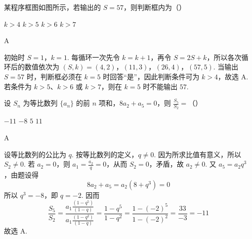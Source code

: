 \begin{problem}
某程序框图如图所示，若输出的 \(S = 57\)，则判断框内为（\quad）


\choices
    {\(k > 4\)}
    {\(k > 5\)}
    {\(k > 6\)}
    {\(k > 7\)}

\begin{answer}
A
\end{answer}

\begin{solution}
初始时 \(S=1\)，\(k=1\). 每循环一次先令 \(k=k+1\)，再令
\(S=2S+k\)，所以各次循环后的数值依次为
\((S,k)=(4,2)\)，\((11,3)\)，\((26,4)\)，\((57,5)\).
当输出 \(S=57\) 时，判断框必须在 \(k=5\) 时回答“是”，因此判断条件可为
\(k>4\)，故选 A. 若条件为 \(k>5\)、\(k>6\) 或 \(k>7\)，则在 \(k=5\) 时不能输出 \(57\).
\end{solution}
\end{problem}

\begin{problem}
设 \(S_n\) 为等比数列 \(\{a_n\}\) 的前 \(n\) 项和，\(8a_2 + a_5 = 0\)，则 \(\frac{S_5}{S_2} =\)（\quad）

\choices
    {\(-11\)}
    {\(-8\)}
    {\(5\)}
    {\(11\)}

\begin{answer}
A
\end{answer}

\begin{solution}
设等比数列的公比为 \(q\). 按等比数列的定义，\(q\ne0\). 因为所求比值有意义，所以
\(S_2\ne0\). 若 \(a_2=0\)，则 \(a_1=\frac{a_2}{q}=0\)，从而 \(S_2=0\)，矛盾，故
\(a_2\ne0\). 又
\(a_5=a_2q^3\)，由题设得
\[
8a_2+a_5=a_2(8+q^3)=0
\]
所以 \(q^3=-8\)，即 \(q=-2\). 因而
\[
\frac{S_5}{S_2}
=\frac{a_1\frac{(1-q^5)}{(1-q)}}{a_1\frac{(1-q^2)}{(1-q)}}
=\frac{1-q^5}{1-q^2}
=\frac{1-(-2)^5}{1-(-2)^2}
=\frac{33}{-3}=-11
\]
故选 A.
\end{solution}
\end{problem}

